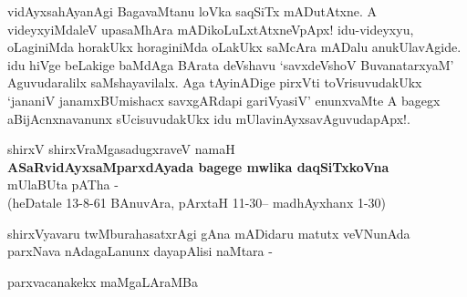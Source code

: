 vidAyxsahAyanAgi BagavaMtanu loVka saqSiTx mADutAtxne. A videyxyiMdaleV upasaMhAra mADikoLuLxtAtxneVpApx! idu-videyxyu, oLaginiMda horakUkx horaginiMda oLakUkx saMcAra mADalu anukUlavAgide. idu hiVge beLakige baMdAga BArata deVshavu `savxdeVshoV BuvanatarxyaM' Aguvudaralilx saMshayavilalx. Aga tAyinADige pirxVti toVrisuvudakUkx `jananiV janamxBUmishacx savxgARdapi gariVyasiV' enunxvaMte A bagegx aBijAcnxnavanunx sUcisuvudakUkx idu mUlavinAyxsavAguvudapApx!.


\begin{center}
shirxV shirxVraMgasadugxraveV namaH\\
\textbf{ASaRvidAyxsaMparxdAyada bagege mwlika daqSiTxkoVna}\\
mUlaBUta pATha -\\
(heDatale 13-8-61 BAnuvAra, pArxtaH 11-30-- madhAyxhanx 1-30)
\end{center}

shirxVyavaru twMburahasatxrAgi gAna mADidaru matutx veVNunAda parxNava nAdagaLanunx dayapAlisi naMtara -

parxvacanakekx maMgaLAraMBa

